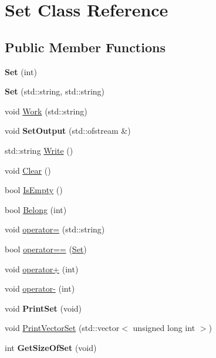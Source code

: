 \hypertarget{classSet}{}\section{Set Class Reference}
\label{classSet}
\subsection*{Public Member Functions}
\begin{DoxyCompactItemize}
\item 
\mbox{\label{classSet_a545e44270dff7f873f7203aa5c6ca3a1}} 
{\bfseries Set} (int)
\item 
\mbox{\label{classSet_a9387dcd9189f0b036d731cf4f169de05}} 
{\bfseries Set} (std\+::string, std\+::string)
\item 
void \hyperlink{classSet_aa25ad5b9d72e4d428eb564b2eb208e3b}{Work} (std\+::string)
\item 
\mbox{\label{classSet_acc57a5a86498c7efb365b4dfbf1fd247}} 
void {\bfseries Set\+Output} (std\+::ofstream \&)
\item 
std\+::string \hyperlink{classSet_afc0f35a8d6903b892bb283813511fea9}{Write} ()
\item 
void \hyperlink{classSet_abe5c5439f3665baba2da0b1f1a4c03fd}{Clear} ()
\item 
bool \hyperlink{classSet_a0361a3a2b7a408514a259b326245cbc7}{Is\+Empty} ()
\item 
bool \hyperlink{classSet_a8fb9899afe9a09628706cf539cc75a1c}{Belong} (int)
\item 
void \hyperlink{classSet_a7f28cadb13f4cc86a87f64b9f885877a}{operator=} (std\+::string)
\item 
bool \hyperlink{classSet_a3087ba7a27e33fbb1b2a091c405ba046}{operator==} (\hyperlink{classSet}{Set})
\item 
void \hyperlink{classSet_a33786bba5f634c5023d047b5f1f1a292}{operator+} (int)
\item 
void \hyperlink{classSet_a1e58afdc9befac1dbe295a0bdccfeacb}{operator-\/} (int)
\item 
\mbox{\label{classSet_a1440c7bdad66b1864b41b4aafb188245}} 
void {\bfseries Print\+Set} (void)
\item 
void \hyperlink{classSet_a167b6d87b1698a61f269835c34c455cc}{Print\+Vector\+Set} (std\+::vector$<$ unsigned long int $>$)
\item 
\mbox{\label{classSet_a6c55977d6e5c48ab791bbe49e832c5ba}} 
int {\bfseries Get\+Size\+Of\+Set} (void)
\end{DoxyCompactItemize}
